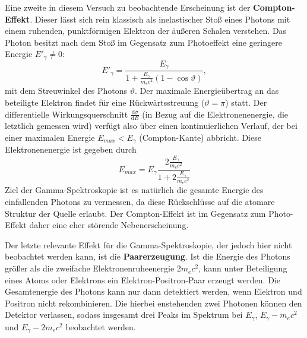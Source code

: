 Eine zweite in diesem Versuch zu beobachtende Erscheinung ist der \textbf{Compton-Effekt}. Dieser lässt sich rein 
klassisch als inelastischer Stoß eines Photons mit einem ruhenden, punktförmigen Elektron der äußeren Schalen verstehen. 
Das Photon besitzt nach dem Stoß im Gegensatz zum Photoeffekt eine geringere Energie $E'_\gamma \neq 0$: 
\begin{equation}
    {E'}_{\!\gamma} = \frac{E_\gamma}{1 + \frac{E_\gamma}{m_e c^2} \left(1 - \cos\vartheta \right)},
\end{equation}
mit dem Streuwinkel des Photons $\vartheta$. Der maximale Energieübertrag an das beteiligte Elektron findet für eine 
Rückwärtsstreuung ($\vartheta = \pi$) statt. Der differentielle Wirkungsquerschnitt $\frac{\mathup{d}\sigma}{\mathup{d}E}$
(in Bezug auf die Elektronenenergie, die letztlich gemessen wird) verfügt also über einen kontinuierlichen Verlauf, der 
bei einer maximalen Energie $E_{max} < E_\gamma$ (Compton-Kante) abbricht. Diese Elektronenenergie ist gegeben durch
\begin{equation}
    E_{max} = E_\gamma \frac{2\frac{E_\gamma}{m_ec^2}}{1 + 2\frac{E_\gamma}{m_ec^2}}
    \label{eq: comptonkante_energie}
\end{equation}
Ziel der Gamma-Spektroskopie ist es natürlich die 
gesamte Energie des einfallenden Photons zu vermessen, da diese Rückschlüsse auf die atomare Struktur der Quelle 
erlaubt. Der Compton-Effekt ist im Gegensatz zum Photo-Effekt daher eine eher störende Nebenerscheinung.

Der letzte relevante Effekt für die Gamma-Spektroskopie, der jedoch hier nicht beobachtet werden kann, ist die 
\textbf{Paarerzeugung}. Ist die Energie des Photons größer als die zweifache Elektronenruheenergie $2m_ec^2$, 
kann unter Beteiligung eines Atoms oder Elektrons ein Elektron-Positron-Paar erzeugt werden. Die Gesamtenergie 
des Photons kann nur dann detektiert werden, wenn Elektron und Positron nicht rekombinieren. Die hierbei enstehenden 
zwei Photonen können den Detektor verlassen, sodass insgesamt drei Peaks im Spektrum bei $E_\gamma$, $E_\gamma - m_ec^2$ und 
$E_\gamma - 2m_ec^2$ beobachtet werden. 

